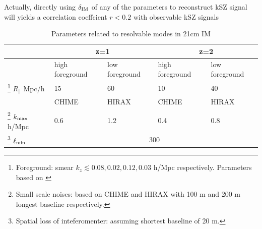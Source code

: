 Actually, directly using $\delta_\mathrm{IM}$ of any of the parameters 
to reconstruct kSZ signal will 
yields a correlation coeffcient $r<0.2$ 
with observable kSZ signals 

\begin{table}
\begin{tabular}{|m{2cm}|m{1.5cm}|m{1.5cm}|m{1.5cm}|m{1.5cm}|}
    \hline
     & \multicolumn{2}{|c|}{z=1} &\multicolumn{2}{|c|}{z=2}\\
     \hline
     & high foreground &low foreground&high foreground& low foreground\\
     \cline{2-5}
     \footnote{Foreground: smear $k_z\lesssim 0.08,0.02,0.12,0.03$ h/Mpc respectively. Parameters based on \cite{2013ApJ...763L..20M,Switzer13,15Shaw}}
     $R_\parallel$ Mpc/h
      & 15 & 60 & 10 & 40 \\
     \hline
     & CHIME & HIRAX & CHIME &HIRAX\\
     \cline{2-5}
     \footnote{Small scale noises: based on CHIME\cite{2014CHIME} and HIRAX\cite{HIRAX} 
     with 100 m and 200 m longest baseline respectively.}
     $k_\mathrm{max}$ h/Mpc 
     & 0.6 & 1.2 & 0.4 & 0.8 \\
     \hline
     \footnote{Spatial loss of inteferomenter: assuming shortest baseline of 20 m.}
     $\ell_\mathrm{min}$
     & \multicolumn{4}{|c|}{300} \\
     \hline
\end{tabular}
     \caption{Parameters related to resolvable modes in 21cm IM}
     \label{tab:para}
\end{table}
